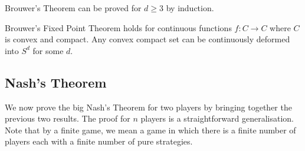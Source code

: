 	\begin{claim}
		Brouwer's Theorem can be proved for $d \ge 3$ by induction.
	\end{claim}
	\begin{remark}
		Brouwer's Fixed Point Theorem holds for continuous functions $f:C
		\rightarrow C$ where $C$ is convex and compact. Any convex compact set
		can be continuously deformed into $S^d$ for some $d$.
	\end{remark}

	\subsection{Nash's Theorem}
	We now prove the big Nash's Theorem for two players by bringing together
	the previous two results. The proof for $n$ players is a straightforward
	generalisation. Note that by a finite game, we mean a game in which there
	is a finite number of players each with a finite number of pure strategies.


